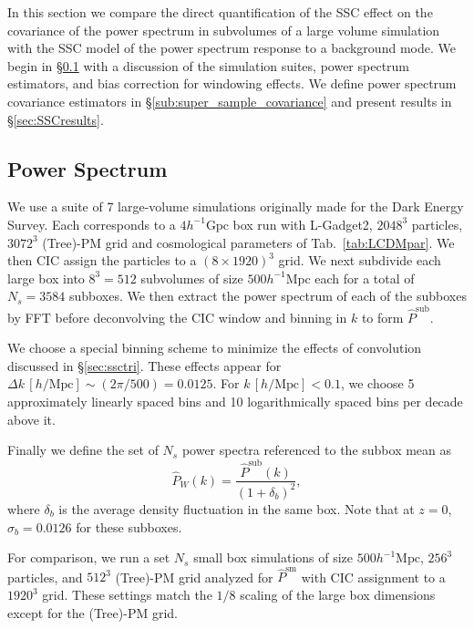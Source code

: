 \documentclass[prd,twocolumn,amsmath,amssymb,floatfix,superscriptaddress]{revtex4-1}
\begin{document}
In this section we compare the direct quantification of the SSC effect on the covariance
of the power spectrum in subvolumes of
a large volume simulation with the SSC model of the power spectrum response to
a background mode.  We begin in \S \ref{sec:SSCpower} with a discussion of the simulation suites, power
spectrum estimators, and bias correction for windowing effects.   We define 
power spectrum covariance estimators in \S \ref{sub:super_sample_covariance} and 
present results in \S \ref{sec:SSCresults}.

\subsection{Power Spectrum}
\label{sec:SSCpower}



We use a suite of 7 large-volume simulations originally made for the Dark Energy Survey.  Each corresponds to a $4h^{-1} \text{Gpc}$ box run with
 L-Gadget2, $2048^3$ particles,
$3072^3$   (Tree)-PM  grid and cosmological parameters of Tab.~\ref{tab:LCDMpar}.   We then CIC assign the particles to a  $(8 \times 1920)^3$ grid.
 We next subdivide each large box into $8^3=512$ subvolumes of size $500 h^{-1} \text{Mpc}$  each for a total of $N_{s}=3584$ subboxes.  
We  then extract the power spectrum of each of the subboxes by FFT before
deconvolving the CIC window and binning in $k$ to form $\hat P^\text{sub}$. 

{We choose a special binning scheme to minimize the effects of
convolution discussed in  \S \ref{sec:ssctri}.   These effects appear for $\Delta k
\,[h/\text{Mpc}] \sim
(2\pi/500 ) =0.0125$.    
For $k\,[h/\text{Mpc}] < 0.1$, we choose 5 approximately linearly spaced bins and
10 logarithmically spaced bins per decade above it.}

Finally we define the set of $N_s$ power spectra referenced to the subbox mean as
\begin{equation}
\hat P_W(k) = \frac{\hat P^\text{sub}(k)}{(1+ \delta_b)^2},
\end{equation}
where $\delta_b$ is the average density fluctuation in the same box.  Note that
at $z=0$, $\sigma_b=0.0126$ for these subboxes.

For comparison, we run a set $N_s$ small box simulations of size $500 h^{-1} \text{Mpc}$,
$256^3$ particles, and  $512^3$ (Tree)-PM  grid analyzed for $\hat P^\text{sm}$ with CIC assignment to a
$1920^3$ grid.   These settings match the $1/8$ scaling of the large box dimensions except
for the (Tree)-PM grid.   
\end{document}
